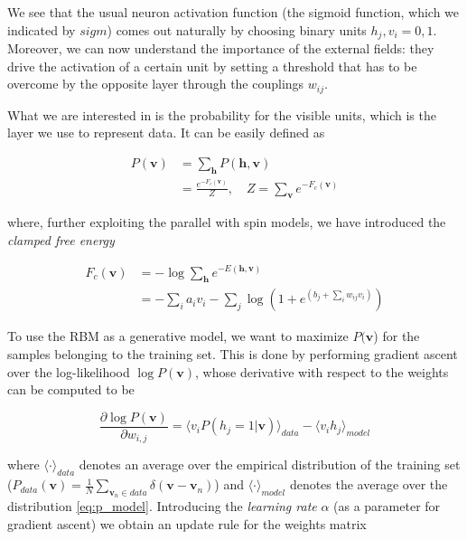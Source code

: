 \documentclass[notitlepage]{revtex4-1}
\begin{document}
We see that the usual neuron activation function (the sigmoid function, which we indicated by \(sigm\)) comes out naturally by choosing binary units \(h_j,v_i = 0,1\). Moreover, we can now understand the importance of the external fields: they drive the activation of a certain unit by setting a threshold that has to be overcome by the opposite layer through the couplings \(w_{ij}\).

What we are interested in is the probability for the visible units, which is the layer we use to represent data. It can be easily defined as

\begin{align}
P(\textbf{v}) &  = \sum_{\textbf{h}} P(\textbf{h},\textbf{v}) \nonumber \\
& = \frac{e^{-F_c(\textbf{v})}}{Z}, \quad Z = \sum_{\textbf{v}} e^{-F_c(\textbf{v})}
\label{eq:p_model}
\end{align}

where, further exploiting the parallel with spin models, we have introduced the \textit{clamped free energy}

\begin{align}
F_c(\textbf{v}) & = -\log \sum_{\textbf{h}} e^{-E(\textbf{h},\textbf{v})} \nonumber \\
& = -\sum_i a_i v_i -\sum_j \log \left( 1 +  e^{\left( b_j + \sum_i w_{ij} v_i \right)} \right)
\end{align}

To use the RBM as a generative model, we want to maximize \(P(\textbf{v}\)) for the samples belonging to the training set. This is done by performing gradient ascent over the log-likelihood \(\log P(\textbf{v})\), whose derivative with respect to the weights can be computed to be

\begin{equation}
\frac{\partial \log P(\textbf{v})}{\partial w_{i,j}} = \langle v_i P(h_j = 1 | \mathbf{v}) \rangle_{data} - \langle v_i h_j \rangle_{model}
\label{eq:opt}
\end{equation}

where \(\langle \cdot \rangle_{data}\) denotes an average over the empirical distribution of the training set (\( \textstyle P_{data}(\mathbf{v}) = \frac{1}{N} \sum_{\mathbf{v}_n \in data} \delta (\mathbf{v} - \mathbf{v}_n ) \)) and 
\(\langle \cdot \rangle_{model}\) denotes the average over the distribution \eqref{eq:p_model}. Introducing the \textit{learning rate} \(\alpha \) (as a parameter for gradient ascent) we obtain an update rule for the weights matrix
\end{document}
